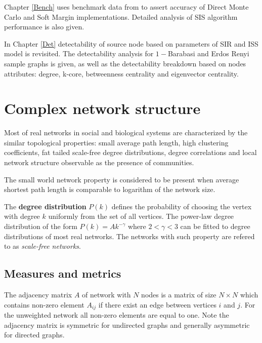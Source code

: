 \documentclass[times, utf8, diplomski]{fer}
\begin{document}
Chapter \ref{Bench} uses benchmark data from \cite{Nino} to assert accuracy of Direct Monte Carlo and Soft Margin implementations. Detailed analysis of SIS algorithm performance is also given.

In Chapter \ref{Det} detectability of source node based on parameters of SIR and ISS model is revisited. The detectability analysis for $1-$Barabasi and Erdos Renyi sample graphs is given, as well as the detectability breakdown based on nodes attributes: degree, k-core, betweenness centrality and eigenvector centrality.

\chapter{Complex network structure}
\label{structure}
Most of real networks in social and biological systems are characterized by the similar topological properties: small average path length, high clustering coefficients, fat tailed scale-free degree distributions, degree correlations and  local network structure observable as the presence of communities.

The small world network property is considered to be present when average shortest path length is comparable to logarithm of the network size. 

The \textbf{degree distribution} $P(k)$ defines the probability of choosing the vertex with degree $k$ uniformly from the set of all vertices. The power-law degree distribution of the form $P(k) = Ak^{-\gamma}$ where $2<\gamma<3$ can be fitted to degree distributions of most real networks. The networks with such property are refered to as \emph{scale-free networks}. 


\section{Measures and metrics}
The adjacency matrix $A$ of network with $N$ nodes is a matrix of size $N \times N$ which contains non-zero element $A_{ij}$ if there exist an edge between vertices $i$ and $j$. For the unweighted network all non-zero elements are equal to one.  Note the adjacency matrix is symmetric for undirected graphs and generally asymmetric for  directed graphs.
\end{document}
